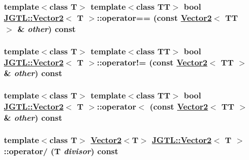\hypertarget{class_j_g_t_l_1_1_vector2_62f44ba61eaea3f9b66d8eae10c08d39}{
\subsubsection[operator==]{\setlength{\rightskip}{0pt plus 5cm}template$<$class T$>$ template$<$class TT$>$ bool \hyperlink{class_j_g_t_l_1_1_vector2}{JGTL::Vector2}$<$ T $>$::operator== (const \hyperlink{class_j_g_t_l_1_1_vector2}{Vector2}$<$ TT $>$ \& {\em other}) const}}
\label{class_j_g_t_l_1_1_vector2_62f44ba61eaea3f9b66d8eae10c08d39}


\hypertarget{class_j_g_t_l_1_1_vector2_46d43cf2f34da5ef6cd7cdb557e8cb65}{
\subsubsection[operator"!=]{\setlength{\rightskip}{0pt plus 5cm}template$<$class T$>$ template$<$class TT$>$ bool \hyperlink{class_j_g_t_l_1_1_vector2}{JGTL::Vector2}$<$ T $>$::operator!= (const \hyperlink{class_j_g_t_l_1_1_vector2}{Vector2}$<$ TT $>$ \& {\em other}) const}}
\label{class_j_g_t_l_1_1_vector2_46d43cf2f34da5ef6cd7cdb557e8cb65}


\hypertarget{class_j_g_t_l_1_1_vector2_c9de5511a6a307af0e4a1de5211e551d}{
\subsubsection[operator$<$]{\setlength{\rightskip}{0pt plus 5cm}template$<$class T$>$ template$<$class TT$>$ bool \hyperlink{class_j_g_t_l_1_1_vector2}{JGTL::Vector2}$<$ T $>$::operator$<$ (const \hyperlink{class_j_g_t_l_1_1_vector2}{Vector2}$<$ TT $>$ \& {\em other}) const}}
\label{class_j_g_t_l_1_1_vector2_c9de5511a6a307af0e4a1de5211e551d}


\hypertarget{class_j_g_t_l_1_1_vector2_70a0c52f426b71ec1bf352b840a8ff6c}{
\subsubsection[operator/]{\setlength{\rightskip}{0pt plus 5cm}template$<$class T$>$ \hyperlink{class_j_g_t_l_1_1_vector2}{Vector2}$<$T$>$ \hyperlink{class_j_g_t_l_1_1_vector2}{JGTL::Vector2}$<$ T $>$::operator/ (T {\em divisor}) const}}
\label{class_j_g_t_l_1_1_vector2_70a0c52f426b71ec1bf352b840a8ff6c}


